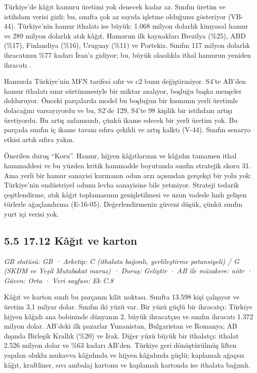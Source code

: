 Türkiye'de kâğıt hamuru üretimi yok denecek kadar az. Sınıfın üretim ve istihdam verisi gizli; bu, sınıfta çok az sayıda işletme olduğunu gösteriyor (VB-44). Türkiye'nin hamur ithalatı ise büyük: 1.068 milyon dolarlık kimyasal hamur ve 289 milyon dolarlık atık kâğıt. Hamurun ilk kaynakları Brezilya (\%25), ABD (\%17), Finlandiya (\%16), Uruguay (\%11) ve Portekiz. Sınıfın 117 milyon dolarlık ihracatının \%77 kadarı İran'a gidiyor; bu, büyük olasılıkla ithal hamurun yeniden ihracatı \etiketH{}.

Hamurda Türkiye'nin MFN tarifesi sıfır ve c2 bunu değiştirmiyor. S4'te AB'den hamur ithalatı sınır sürtünmesiyle bir miktar azalıyor, boşluğu başka menşeler dolduruyor. Önceki parçalarda model bu boşluğun bir kısmının yerli üretimle dolacağını varsayıyordu ve bu, S2'de 129, S4'te 98 kişilik bir istihdam artışı üretiyordu. Bu artış anlamsızdı, çünkü ikame edecek bir yerli üretim yok. Bu parçada sınıfın iç ikame tavanı sıfıra çekildi ve artış kalktı (V-44). Sınıfın senaryo etkisi artık sıfıra yakın.

Önerilen duruş ``Koru''. Hamur, hijyen kâğıtlarının ve kâğıdın tamamen ithal hammaddesi ve bu yüzden kritik hammadde boyutunda sınıfın stratejik skoru 31. Ama yerli bir hamur sanayisi kurmanın odun arzı açısından gerçekçi bir yolu yok: Türkiye'nin endüstriyel odunu levha sanayisine bile yetmiyor. Strateji tedarik çeşitlendirme, atık kâğıt toplamasının genişletilmesi ve uzun vadede hızlı gelişen türlerle ağaçlandırma (E-16-05). Değerlendirmenin güveni düşük, çünkü sınıfın yurt içi verisi yok.

\hypertarget{nace_kartlar_16-18-55-1712-kuxe2ux11fux131t-ve-karton}{%
\subsection{5.5 17.12 Kâğıt ve karton}\label{nace_kartlar_16-18-55-1712-kuxe2ux11fux131t-ve-karton}}

\emph{GB statüsü: GB · Arketip: C (ithalata bağımlı, yerlileştirme potansiyeli) / G (SKDM ve Yeşil Mutabakat maruz) · Duruş: Geliştir · AB ile müzakere: nötr · Güven: Orta · Veri sayfası: Ek C.8}

Kâğıt ve karton sınıfı bu parçanın kilit noktası. Sınıfta 13.598 kişi çalışıyor ve üretim 3,1 milyar dolar. Sınıfın iki yüzü var. Bir yüzü güçlü bir ihracatçı: Türkiye hijyen kâğıdı ana bobininde dünyanın 2. büyük ihracatçısı ve sınıfın ihracatı 1.372 milyon dolar. AB'deki ilk pazarlar Yunanistan, Bulgaristan ve Romanya; AB dışında Birleşik Krallık (\%20) ve Irak. Diğer yüzü büyük bir ithalatçı: ithalat 2.526 milyon dolar ve \%63 kadarı AB'den. Türkiye geri dönüştürülmüş liften yapılan oluklu mukavva kâğıdında ve hijyen kâğıdında güçlü; kaplamalı ağaçsız kâğıt, kraftliner, sıvı ambalaj kartonu ve kaplamalı kartonda ise ithalata bağımlı.

